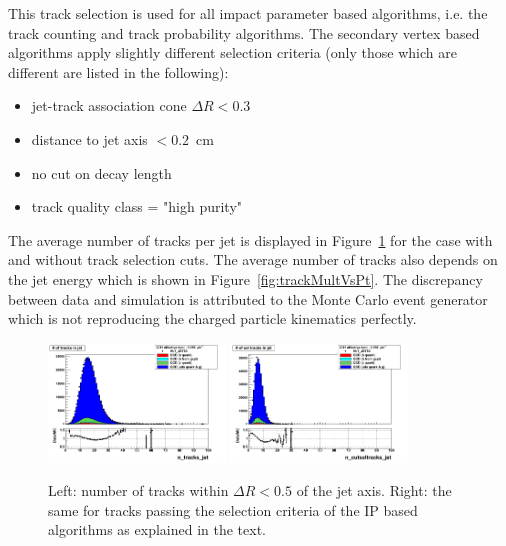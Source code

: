 This track selection is used for all impact parameter based algorithms, i.e. the track counting and track probability algorithms. The secondary vertex based algorithms apply slightly different selection criteria (only those which are different are listed in the following):
\begin{itemize}
\item jet-track association cone $\Delta R < 0.3$
\item distance to jet axis $ < 0.2$~cm
\item no cut on decay length
\item track quality class = "high purity" 
\end{itemize}

The average number of tracks per jet is displayed in Figure~\ref{fig:trackMult} 
for the case with and without track selection cuts.  The average number of tracks also depends on the jet energy which is shown in Figure~\ref{fig:trackMultVsPt}. The discrepancy between data and simulation is attributed to the Monte Carlo event generator which is not reproducing the charged particle kinematics perfectly.


\begin{figure}[h!]
\centering
\includegraphics[width=0.42\textwidth]{figures/n_tracks_jet_Linear.png}
\includegraphics[width=0.42\textwidth]{figures/n_cutseltracks_jet_Linear.png}
\caption{Left: number of tracks within $\Delta R < 0.5$ of the jet axis. Right: the same for tracks passing the selection criteria of the IP based algorithms as explained in the text.}
\label{fig:trackMult}
\end{figure}

